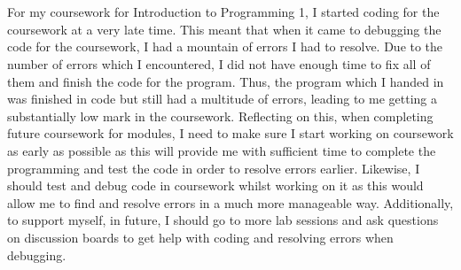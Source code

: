 \documentclass[Final Report]{article}
\begin{document}
\section {}
For my coursework for Introduction to Programming 1, I started coding for the coursework at a very late time. This meant that when it came to debugging the code for the coursework, I had a mountain of errors I had to resolve. Due to the number of errors which I encountered, I did not have enough time to fix all of them and finish the code for the program. Thus, the program which I handed in was finished in code but still had a multitude of errors, leading to me getting a substantially low mark in the coursework. Reflecting on this, when completing future coursework for modules, I need to make sure I start working on coursework as early as possible as this will provide me with sufficient time to complete the programming and test the code in order to resolve errors earlier. Likewise, I should test and debug code in coursework whilst working on it as this would allow me to find and resolve errors in a much more manageable way. Additionally, to support myself, in future, I should go to more lab sessions and ask questions on discussion boards to get help with coding and resolving errors when debugging.
\end{document}
